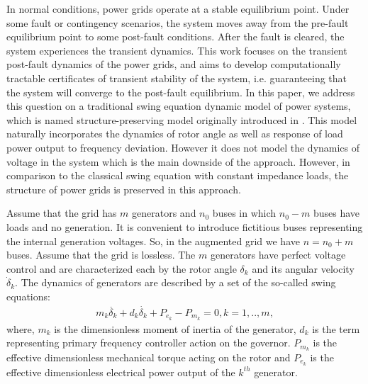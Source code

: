\documentclass[final]{IEEEtran}
\begin{document}
In normal conditions, power grids operate at a stable equilibrium
point. Under some fault or contingency scenarios, the system moves
away from the pre-fault equilibrium point to some post-fault
conditions. After the fault is cleared, the system experiences the
transient dynamics. This work focuses on the transient post-fault
dynamics of the power grids, and aims to develop computationally
tractable certificates of transient stability of the system, i.e.
guaranteeing that the system will converge to the post-fault
equilibrium. In this paper, we address this question on a
traditional swing equation dynamic model of power systems, which is named structure-preserving model originally introduced in \cite{bergen1981structure}.
This model naturally incorporates the dynamics of rotor angle as well as response of load power output to frequency deviation. However it does not model the dynamics of voltage in the system which is the main downside of the approach. However, in comparison to the classical swing equation with constant impedance loads, the structure of power grids is preserved in this approach.

Assume that the grid has $m$ generators and $n_0$ buses in which $n_0-m$ buses have loads and no generation. It is convenient to introduce fictitious buses representing the internal generation voltages. So, in the augmented grid we have $n=n_0+m$ buses. Assume that the grid is lossless. The $m$
generators have perfect voltage control and are characterized each
by the rotor angle $\delta_k$ and its angular velocity
$\dot\delta_k$. The dynamics of generators are described by a set
of the so-called swing equations:
\begin{align}
\label{eq.swing1}
  m_k \ddot{\delta_k} + d_k \dot{\delta_k} + P_{e_k}-P_{m_k}
  =0, k=1,..,m,
\end{align}
where, $m_k$ is the dimensionless moment of inertia of the
generator, $d_k$ is the term representing primary frequency
controller action on the governor. $P_{m_k}$ is the effective
dimensionless mechanical torque acting on the rotor and $P_{e_k}$
is the effective dimensionless electrical power output of the
$k^{th}$ generator. 
\end{document}
